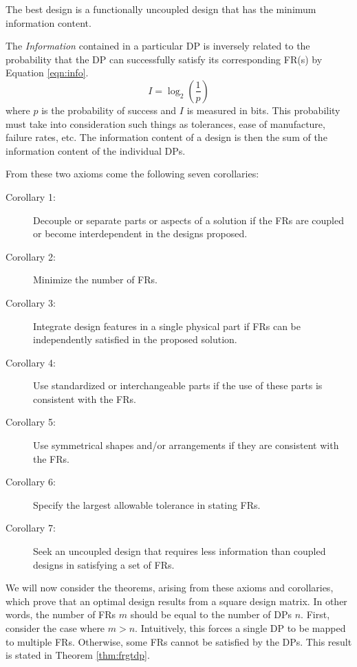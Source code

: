 \begin{axiom}[Information]
  The best design is a functionally uncoupled design that has the minimum information content.
\end{axiom}

The \emph{Information} contained in a particular DP is inversely related to the probability that the DP can
successfully satisfy its corresponding FR(s) by Equation \ref{eqn:info}.
\begin{equation}
  \label{eqn:info}
  I=\log_2\left(\frac{1}{p}\right)
\end{equation}
where \(p\) is the probability of success and \(I\) is measured in bits.  This probability must take into
consideration such things as tolerances, ease of manufacture, failure rates, etc.  The information content of a
design is then the sum of the information content of the individual DPs.

From these two axioms come the following seven corollaries:
\begin{description}
\item[Corollary 1:] Decouple or separate parts or aspects of a solution if the FRs are coupled or become
  interdependent in the designs proposed.
\item[Corollary 2:] Minimize the number of FRs.
\item[Corollary 3:] \label{cor:integrate} Integrate design features in a single physical part if FRs can be
  independently satisfied in the proposed solution.
\item[Corollary 4:] Use standardized or interchangeable parts if the use of these parts is consistent with the FRs.
\item[Corollary 5:] Use symmetrical shapes and/or arrangements if they are consistent with the FRs.
\item[Corollary 6:] Specify the largest allowable tolerance in stating FRs.
\item[Corollary 7:] Seek an uncoupled design that requires less information than coupled designs in satisfying a
  set of FRs.
\end{description}

We will now consider the theorems, arising from these axioms and corollaries, which prove that an optimal design
results from a square design matrix.  In other words, the number of FRs \(m\) should be equal to the number of DPs
\(n\).  First, consider the case where \(m>n\).  Intuitively, this forces a single DP to be mapped to multiple FRs.
Otherwise, some FRs cannot be satisfied by the DPs.  This result is stated in Theorem \ref{thm:frgtdp}.

